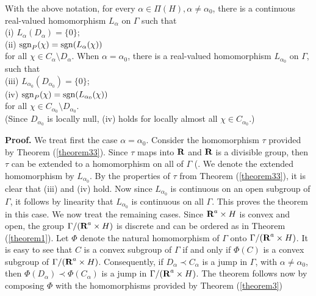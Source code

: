 \begin{theorem35}
With the above notation, for every $\alpha \in \Pi(H), 
\alpha\neq \alpha_0$, there is a continuous 
real-valued homomorphism $L_\alpha$ on $\Gamma$ such that \\
%
%
%
(i)  $ L_\alpha \left(D_\alpha\right)=\{0\}$;\\
%
%
%
(ii) ${\rm sgn}_P (\chi)={\rm sgn}(L_\alpha(\chi))$\\
for all $\chi\in C_\alpha\setminus D_\alpha$.  
When $\alpha=\alpha_0$, there is a real-valued 
homomorphism $L_{\alpha_0}$ on $\Gamma$, such that\\
%
%
%
%
%
%
(iii)   $ L_{\alpha_0}\left( D_{\alpha_0}\right)=\{0\}$;\\
%
%
%
(iv) ${\rm sgn}_P (\chi)={\rm sgn}(L_{\alpha_0} (\chi))$\\
for all $\chi\in C_{\alpha_0}\setminus D_{\alpha_0}$.  \\
(Since $D_{\alpha_0}$ is locally null, (iv) holds for
locally almost all $\chi\in C_{\alpha_0}$.)
\label{theorem35}
\end{theorem35}
%
%
%
{\bf Proof.}  We treat first the case $\alpha=\alpha_0$.  
%
Consider the homomorphism $\tau$ 
provided by Theorem (\ref{theorem33}).  
%
Since $\tau$ maps into $\R$ and $\R$ is a 
divisible group, then $\tau$ can 
be extended to a homomorphism on all of 
$\Gamma$ (\cite[Theorem (A.7)]{hr1}.  
We denote the extended homomorphism by 
$L_{\alpha_0}$.  
%
By the properties of $\tau$ from Theorem (\ref{theorem33}), 
it is clear that (iii) and (iv) hold.  
%
Now since $L_{\alpha_0}$ is continuous on an open 
subgroup of $\Gamma$, it follows 
by linearity that $L_{\alpha_0}$ 
is continuous on all $\Gamma$.  
%
This proves the theorem in this case.  
%
We now treat the remaining cases.  
%
Since $\R^a\times H$ is convex and open, 
the group $\Gamma/(\R^a\times H)$ 
is discrete and can be ordered as in 
Theorem (\ref{theorem1}).  Let $\Phi$ denote 
the natural homomorphism of $\Gamma$ onto 
$\Gamma/(\R^a\times H)$.  
%
It is easy to see that $C$ is 
a convex subgroup of $\Gamma$ 
if and only if $\Phi (C)$ is a convex 
subgroup of $\Gamma/(\R^a\times H)$.  
%
Consequently, if $D_\alpha\prec C_\alpha$ 
is a jump in $\Gamma$, with $\alpha\neq \alpha_0$, 
then 
$\Phi(D_\alpha)\prec \Phi(C_\alpha)$
is a jump in $\Gamma/(\R^a\times H)$.  
%
The theorem follows now by composing $\Phi$ with
the homomorphisms provided by Theorem (\ref{theorem3})
